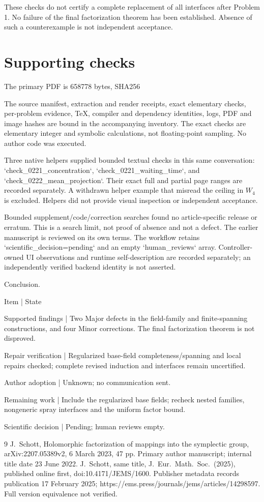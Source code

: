 \documentclass[10pt]{article}
\begin{document}
These checks do not certify a complete replacement of all interfaces after Problem 1. No failure of the final factorization theorem has been established. Absence of such a counterexample is not independent acceptance.\par
\section*{Supporting checks}
The primary PDF is 658778 bytes, SHA256\par
The source manifest, extraction and render receipts, exact elementary checks, per-problem evidence, TeX, compiler and dependency identities, logs, PDF and image hashes are bound in the accompanying inventory. The exact checks are elementary integer and symbolic calculations, not floating-point sampling. No author code was executed.\par
Three native helpers supplied bounded textual checks in this same conversation: `check\_0221\_concentration`, `check\_0221\_waiting\_time`, and `check\_0222\_mean\_projection`. Their exact full and partial page ranges are recorded separately. A withdrawn helper example that misread the ceiling in \(W_4\) is excluded. Helpers did not provide visual inspection or independent acceptance.\par
Bounded supplement/code/correction searches found no article-specific release or erratum. This is a search limit, not proof of absence and not a defect. The earlier manuscript is reviewed on its own terms. The workflow retains `scientific\_decision=pending` and an empty `human\_reviews` array. Controller-owned UI observations and runtime self-description are recorded separately; an independently verified backend identity is not asserted.\par
Conclusion.\par
Item | State\par
Supported findings | Two Major defects in the field-family and finite-spanning constructions, and four Minor corrections. The final factorization theorem is not disproved.\par
Repair verification | Regularized base-field completeness/spanning and local repairs checked; complete revised induction and interfaces remain uncertified.\par
Author adoption | Unknown; no communication sent.\par
Remaining work | Include the regularized base fields; recheck nested families, nongeneric spray interfaces and the uniform factor bound.\par
Scientific decision | Pending; human reviews empty.\par
9 J. Schott, Holomorphic factorization of mappings into the symplectic group, arXiv:2207.05389v2, 6 March 2023, 47 pp. Primary author manuscript; internal title date 23 June 2022. J. Schott, same title, J. Eur. Math. Soc. (2025), published online first, doi:10.4171/JEMS/1600. Publisher metadata records publication 17 February 2025; https://ems.press/journals/jems/articles/14298597. Full version equivalence not verified.\par
\end{document}
